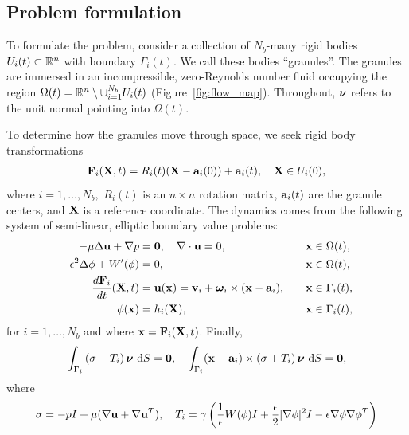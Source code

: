 \subsection{Problem formulation}
To formulate the problem, consider a collection of $N_b$-many rigid
bodies $U_i(t) \subset \RR^n$ with boundary $\Gamma_i(t)$. We call these
bodies ``granules''. The granules are immersed in an incompressible,
zero-Reynolds number fluid occupying the region $\Omega(t) = \RR^n \setminus \cup_{i=1}^{N_b}
U_i(t)$ (Figure~\ref{fig:flow_map}). Throughout, $\nnu$ refers to
the unit normal pointing into $\Omega(t)$.

To determine how the granules move through space, we seek rigid body
transformations
\begin{align}
\label{eq:RBT}
  \FF_i(\XX,t) = R_i(t)(\XX - \aa_i(0)) + \aa_i(t),\quad \XX \in U_i(0),
\end{align}
where $i = 1,\ldots,N_b,$ $R_i(t)$ is an $n
\times n$ rotation matrix, $\aa_i(t)$ are the granule centers, and $\XX$ is a
reference coordinate.
The dynamics comes from the following system of semi-linear, elliptic boundary value problems:
\begin{alignat}{4}
  \label{eqn:stokes} 
  -\mu\Delta \uu + \nabla p &= \mathbf{0}, 
  \quad \nabla \cdot \uu = 0, &&\xx \in \Omega(t), \\
  \label{eqn:phase}
  -\epsilon^2 \Delta \phi + W'(\phi) &= 0, &&\xx \in \Omega(t),\\
  \label{eqn:noslip}        
  \frac{d\FF_i}{dt}(\XX,t) & = \uu(\xx) = 
    \vv_i + \oomega_i \times (\xx - \aa_i), 
  \quad &&\xx \in \Gamma_i(t),\\
  \label{eqn:material}
  \phi(\xx) &= h_i(\XX),  &&\xx \in \Gamma_i(t),
\end{alignat}
for $i=1,\ldots,N_b$ and where $\xx = \FF_i(\XX,t)$. Finally,
\begin{align}
\label{eqn:stressbalance}
\int_{\Gamma_i} \left(\sigma  + T_i\right)\nnu \,\dif S = \mathbf{0},\quad
\int_{\Gamma_i} (\xx - \aa_i)\times \left(\sigma + T_i\right) \nnu
  \,\dif S = \mathbf{0},
\end{align}
where
\begin{align}
\label{eqn:hydro_stress}
\sigma = -pI + \mu(\nabla \uu + \nabla \uu^T),\quad 
T_i = \gamma\left(\frac{1}{\epsilon}W(\phi)I + \frac{\epsilon}{2}|\nabla \phi|^2I - \epsilon \nabla \phi \nabla \phi^T\right)
\end{align}
